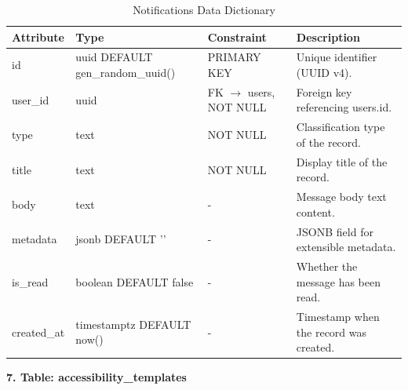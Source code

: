 \documentclass[12pt, oneside]{article} %
\newcommand{\tabbreak}{\hyphenpenalty=200\exhyphenpenalty=200\tolerance=4000\hbadness=10000\hspace{0pt}}
\begin{document}
\begin{table}[H]
\caption{Notifications Data Dictionary}
\label{tab:dd_notifications}
\vspace{-4mm}
\begin{center}
\renewcommand{\arraystretch}{1.15}
\scriptsize
\begin{tabular}{|>{\raggedright\arraybackslash\tabbreak}p{2.67cm}|>{\raggedright\arraybackslash\tabbreak}p{2.93cm}|>{\raggedright\arraybackslash\tabbreak}p{2.67cm}|>{\raggedright\arraybackslash\tabbreak}p{4.51cm}|}
\hline
\textbf{Attribute} & \textbf{Type} & \textbf{Constraint} & \textbf{Description} \\ \hline
id & uuid DEFAULT gen\_random\_uuid() & PRIMARY KEY & Unique identifier (UUID v4). \\ \hline
user\_id & uuid & FK $\rightarrow$ users, NOT NULL & Foreign key referencing users.id. \\ \hline
type & text & NOT NULL & Classification type of the record. \\ \hline
title & text & NOT NULL & Display title of the record. \\ \hline
body & text & - & Message body text content. \\ \hline
metadata & jsonb DEFAULT '{}' & - & JSONB field for extensible metadata. \\ \hline
is\_read & boolean DEFAULT false & - & Whether the message has been read. \\ \hline
created\_at & timestamptz DEFAULT now() & - & Timestamp when the record was created. \\ \hline
\end{tabular}
\end{center}
\end{table}

\textbf{7. Table: accessibility\_templates}
\end{document}
